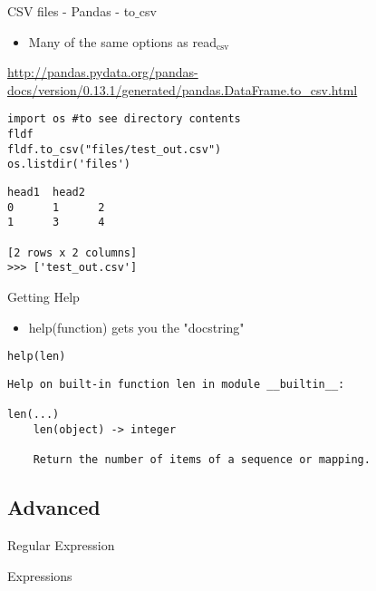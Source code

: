 \documentclass[presentation]{beamer}
\begin{document}
\begin{frame}[fragile,label=sec-4-1-26]{CSV files - Pandas - to\(\_\)csv}
 \begin{itemize}
\item Many of the same options as read$_{\text{csv}}$
\end{itemize}
\url{http://pandas.pydata.org/pandas-docs/version/0.13.1/generated/pandas.DataFrame.to_csv.html}
\lstset{numbers=left,language=Python,label= ,caption= }
\begin{lstlisting}
import os #to see directory contents
fldf
fldf.to_csv("files/test_out.csv")
os.listdir('files')
\end{lstlisting}

\lstset{numbers=left,language=Python,label= ,caption= }
\begin{lstlisting}
head1  head2
0      1      2
1      3      4

[2 rows x 2 columns]
>>> ['test_out.csv']
\end{lstlisting}
\end{frame}


\begin{frame}[fragile,label=sec-4-1-27]{Getting Help}
 \begin{itemize}
\item help(function) gets you the "docstring"
\end{itemize}
\lstset{numbers=left,language=Python,label= ,caption= }
\begin{lstlisting}
help(len)
\end{lstlisting}

\lstset{numbers=left,language=Python,label= ,caption= }
\begin{lstlisting}
Help on built-in function len in module __builtin__:

len(...)
    len(object) -> integer

    Return the number of items of a sequence or mapping.
\end{lstlisting}
\end{frame}


\subsection{Advanced}
\label{sec-4-2}

\begin{frame}[label=sec-4-2-1]{Regular Expression}
\end{frame}

\begin{frame}[label=sec-4-2-2]{Expressions}
\end{frame}
\end{document}

